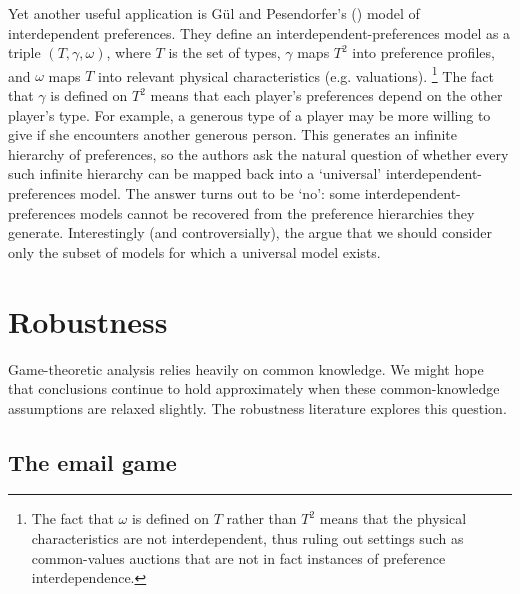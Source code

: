 \documentclass[11pt,letterpaper,reqno,oneside]{article}
\begin{document}
Yet another useful application is Gül and Pesendorfer's (\citeyear{GulPesendorfer2016}) model of interdependent preferences. They define an interdependent-preferences model as a triple $(T,\gamma,\omega)$, where $T$ is the set of types, $\gamma$ maps $T^2$ into preference profiles, and $\omega$ maps $T$ into relevant physical characteristics (e.g. valuations).%
	\footnote{The fact that $\omega$ is defined on $T$ rather than $T^2$ means that the physical characteristics are not interdependent, thus ruling out settings such as common-values auctions that are not in fact instances of preference interdependence.}
The fact that $\gamma$ is defined on $T^2$ means that each player's preferences depend on the other player's type. For example, a generous type of a player may be more willing to give if she encounters another generous person. This generates an infinite hierarchy of preferences, so the authors ask the natural question of whether every such infinite hierarchy can be mapped back into a `universal' interdependent-preferences model. The answer turns out to be `no': some interdependent-preferences models cannot be recovered from the preference hierarchies they generate. Interestingly (and controversially), the argue that we should consider only the subset of models for which a universal model exists.



\pagebreak
\section{Robustness}
\label{sec:robustness}

Game-theoretic analysis relies heavily on common knowledge. We might hope that conclusions continue to hold approximately when these common-knowledge assumptions are relaxed slightly. The robustness literature explores this question.



\subsection{The email game}
\label{sec:robustness:email_game}

\end{document}
